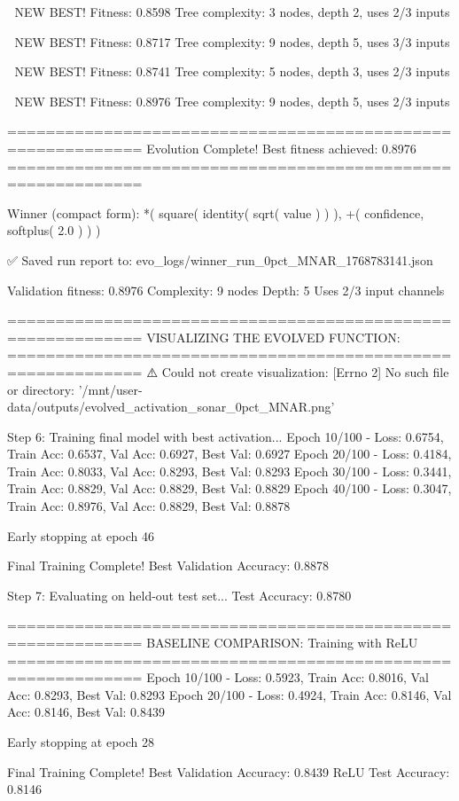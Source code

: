 🎯 NEW BEST! Fitness: 0.8598
Tree complexity: 3 nodes, depth 2, uses 2/3 inputs

🎯 NEW BEST! Fitness: 0.8717
Tree complexity: 9 nodes, depth 5, uses 3/3 inputs

🎯 NEW BEST! Fitness: 0.8741
Tree complexity: 5 nodes, depth 3, uses 2/3 inputs

🎯 NEW BEST! Fitness: 0.8976
Tree complexity: 9 nodes, depth 5, uses 2/3 inputs

============================================================
Evolution Complete!
Best fitness achieved: 0.8976
============================================================

Winner (compact form):
 *(
  square(
    identity(
      sqrt(
        value
      )
    )
  ),
  +(
    confidence,
    softplus(
      2.0
    )
  )
)

✅ Saved run report to: evo_logs/winner_run_0pct_MNAR_1768783141.json

Validation fitness: 0.8976
Complexity: 9 nodes
Depth: 5
Uses 2/3 input channels

============================================================
VISUALIZING THE EVOLVED FUNCTION:
============================================================
⚠️ Could not create visualization: [Errno 2] No such file or directory: '/mnt/user-data/outputs/evolved_activation_sonar_0pct_MNAR.png'

Step 6: Training final model with best activation...
Epoch  10/100 - Loss: 0.6754, Train Acc: 0.6537, Val Acc: 0.6927, Best Val: 0.6927
Epoch  20/100 - Loss: 0.4184, Train Acc: 0.8033, Val Acc: 0.8293, Best Val: 0.8293
Epoch  30/100 - Loss: 0.3441, Train Acc: 0.8829, Val Acc: 0.8829, Best Val: 0.8829
Epoch  40/100 - Loss: 0.3047, Train Acc: 0.8976, Val Acc: 0.8829, Best Val: 0.8878

Early stopping at epoch 46

Final Training Complete!
Best Validation Accuracy: 0.8878

Step 7: Evaluating on held-out test set...
Test Accuracy: 0.8780

============================================================
BASELINE COMPARISON: Training with ReLU
============================================================
Epoch  10/100 - Loss: 0.5923, Train Acc: 0.8016, Val Acc: 0.8293, Best Val: 0.8293
Epoch  20/100 - Loss: 0.4924, Train Acc: 0.8146, Val Acc: 0.8146, Best Val: 0.8439

Early stopping at epoch 28

Final Training Complete!
Best Validation Accuracy: 0.8439
ReLU Test Accuracy: 0.8146

